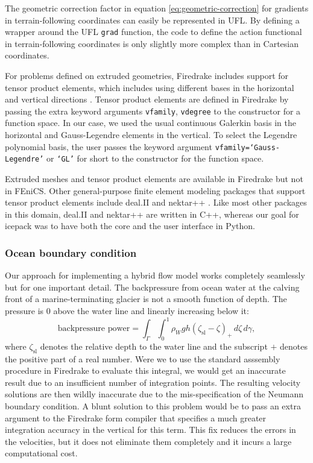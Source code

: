 \documentclass[journal abbreviation, manuscript]{copernicus}
\begin{document}
The geometric correction factor in equation \eqref{eq:geometric-correction} for gradients in terrain-following coordinates can easily be represented in UFL.
By defining a wrapper around the UFL \texttt{grad} function, the code to define the action functional in terrain-following coordinates is only slightly more complex than in Cartesian coordinates.

For problems defined on extruded geometries, Firedrake includes support for tensor product elements, which includes using different bases in the horizontal and vertical directions \citep{mcrae2016automated}.
Tensor product elements are defined in Firedrake by passing the extra keyword arguments \texttt{vfamily}, \texttt{vdegree} to the constructor for a function space.
In our case, we used the usual continuous Galerkin basis in the horizontal and Gauss-Legendre elements in the vertical.
To select the Legendre polynomial basis, the user passes the keyword argument \texttt{vfamily=`Gauss-Legendre'} or \texttt{`GL'} for short to the constructor for the function space.

Extruded meshes and tensor product elements are available in Firedrake but not in FEniCS.
Other general-purpose finite element modeling packages that support tensor product elements include deal.II and nektar++ \citep{bangerth2007deal, cantwell2015nektar++}.
Like most other packages in this domain, deal.II and nektar++ are written in C++, whereas our goal for icepack was to have both the core and the user interface in Python.

\subsubsection{Ocean boundary condition}\label{subsubsec:ocean-bc}

Our approach for implementing a hybrid flow model works completely seamlessly but for one important detail.
The backpressure from ocean water at the calving front of a marine-terminating glacier is not a smooth function of depth.
The pressure is 0 above the water line and linearly increasing below it:
\begin{equation}
    \text{backpressure power} = \int_\Gamma\int_0^1 \rho_Wgh(\zeta_{\text{sl}} - \zeta)_+\,d\zeta\,d\gamma,
    \label{backpressure}
\end{equation}
where $\zeta_{\text{sl}}$ denotes the relative depth to the water line and the subscript $+$ denotes the positive part of a real number.
Were we to use the standard asssembly procedure in Firedrake to evaluate this integral, we would get an inaccurate result due to an insufficient number of integration points.
The resulting velocity solutions are then wildly inaccurate due to the mis-specification of the Neumann boundary condition.
A blunt solution to this problem would be to pass an extra argument to the Firedrake form compiler that specifies a much greater integration accuracy in the vertical for this term.
This fix reduces the errors in the velocities, but it does not eliminate them completely and it incurs a large computational cost.
\end{document}
